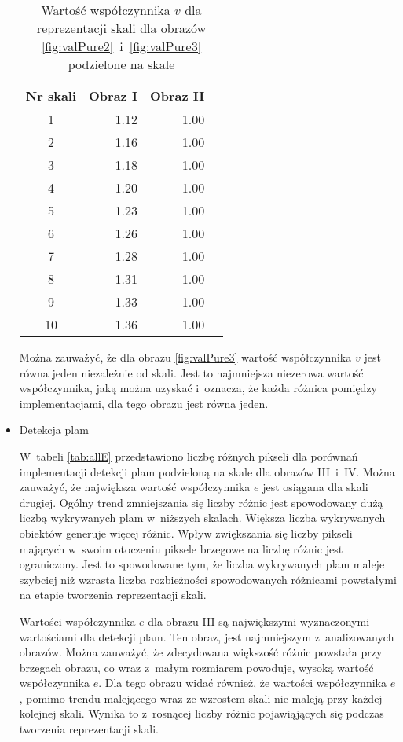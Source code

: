 \begin{itemize}
\begin{center}
\begin{table}
\centering
\caption{Wartość współczynnika $ v $ dla reprezentacji skali dla obrazów \ref{fig:valPure2}~i~\ref{fig:valPure3} podzielone na skale}
\label{tab:allV}
\begin{tabular}{|c|r|r|r|}
\hline
Nr skali & Obraz I  &  Obraz II\\ \hline
1        & 1.12     & 1.00\\ \hline
2        & 1.16     & 1.00\\ \hline
3        & 1.18     & 1.00\\ \hline
4        & 1.20     & 1.00\\ \hline
5        & 1.23     & 1.00\\ \hline
6        & 1.26     & 1.00\\ \hline
7        & 1.28     & 1.00\\ \hline
8        & 1.31     & 1.00\\ \hline
9        & 1.33     & 1.00\\ \hline
10       & 1.36     & 1.00\\ \hline
\end{tabular}
\end{table}
\end{center}


Można zauważyć, że dla obrazu \ref{fig:valPure3} wartość współczynnika $ v $ jest równa jeden niezależnie od skali. Jest to najmniejsza niezerowa wartość współczynnika, jaką można uzyskać i~oznacza, że każda różnica pomiędzy implementacjami, dla tego obrazu jest równa jeden.

\item{Detekcja plam}
\label{subsubsec:plamyTabele}

\nopagebreak
W~tabeli \ref{tab:allE} przedstawiono liczbę różnych pikseli dla porównań implementacji detekcji plam podzieloną na skale dla obrazów III~i~IV. Można zauważyć, że największa wartość współczynnika $ e $ jest osiągana dla skali drugiej. Ogólny trend zmniejszania się liczby różnic jest spowodowany dużą liczbą wykrywanych plam w~niższych skalach. Większa liczba wykrywanych obiektów generuje więcej różnic. Wpływ zwiększania się liczby pikseli mających w~swoim otoczeniu piksele brzegowe na liczbę różnic jest ograniczony. Jest to spowodowane tym, że liczba wykrywanych plam maleje szybciej niż wzrasta liczba rozbieżności spowodowanych różnicami powstałymi na etapie tworzenia reprezentacji skali.

Wartości współczynnika $ e $ dla obrazu III są największymi wyznaczonymi wartościami dla detekcji plam. Ten obraz, jest najmniejszym z~analizowanych obrazów. Można zauważyć, że zdecydowana większość różnic powstała przy brzegach obrazu, co wraz z~małym rozmiarem powoduje, wysoką wartość współczynnika $ e $. Dla tego obrazu widać również, że wartości współczynnika $ e $, pomimo trendu malejącego wraz ze wzrostem skali nie maleją przy każdej kolejnej skali. Wynika to z~rosnącej liczby różnic pojawiąjących się podczas tworzenia reprezentacji skali.



\end{itemize}
